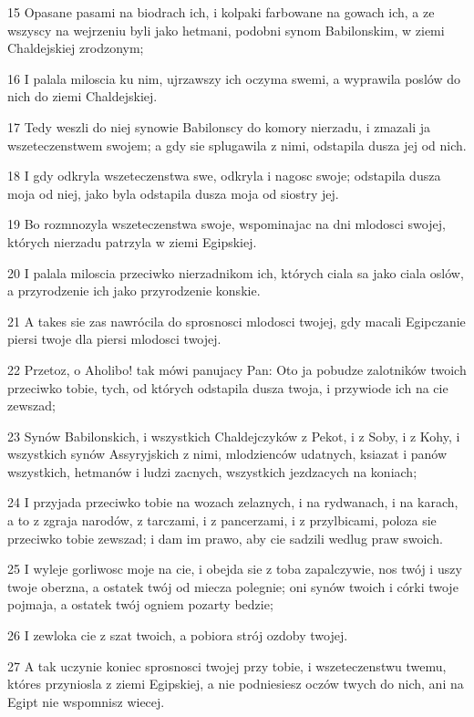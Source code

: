 \par 15 Opasane pasami na biodrach ich, i kolpaki farbowane na gowach ich, a ze wszyscy na wejrzeniu byli jako hetmani, podobni synom Babilonskim, w ziemi Chaldejskiej zrodzonym;
\par 16 I palala miloscia ku nim, ujrzawszy ich oczyma swemi, a wyprawila poslów do nich do ziemi Chaldejskiej.
\par 17 Tedy weszli do niej synowie Babilonscy do komory nierzadu, i zmazali ja wszeteczenstwem swojem; a gdy sie splugawila z nimi, odstapila dusza jej od nich.
\par 18 I gdy odkryla wszeteczenstwa swe, odkryla i nagosc swoje; odstapila dusza moja od niej, jako byla odstapila dusza moja od siostry jej.
\par 19 Bo rozmnozyla wszeteczenstwa swoje, wspominajac na dni mlodosci swojej, których nierzadu patrzyla w ziemi Egipskiej.
\par 20 I palala miloscia przeciwko nierzadnikom ich, których ciala sa jako ciala oslów, a przyrodzenie ich jako przyrodzenie konskie.
\par 21 A takes sie zas nawrócila do sprosnosci mlodosci twojej, gdy macali Egipczanie piersi twoje dla piersi mlodosci twojej.
\par 22 Przetoz, o Aholibo! tak mówi panujacy Pan: Oto ja pobudze zalotników twoich przeciwko tobie, tych, od których odstapila dusza twoja, i przywiode ich na cie zewszad;
\par 23 Synów Babilonskich, i wszystkich Chaldejczyków z Pekot, i z Soby, i z Kohy, i wszystkich synów Assyryjskich z nimi, mlodzienców udatnych, ksiazat i panów wszystkich, hetmanów i ludzi zacnych, wszystkich jezdzacych na koniach;
\par 24 I przyjada przeciwko tobie na wozach zelaznych, i na rydwanach, i na karach, a to z zgraja narodów, z tarczami, i z pancerzami, i z przylbicami, poloza  sie przeciwko tobie zewszad; i dam im prawo, aby cie sadzili wedlug praw swoich.
\par 25 I wyleje gorliwosc moje na cie, i obejda sie z toba zapalczywie, nos twój i uszy twoje oberzna, a ostatek twój od miecza polegnie; oni synów twoich i córki twoje pojmaja, a ostatek twój ogniem pozarty bedzie;
\par 26 I zewloka cie z szat twoich, a pobiora strój ozdoby twojej.
\par 27 A tak uczynie koniec sprosnosci twojej przy tobie, i wszeteczenstwu twemu, któres przyniosla z ziemi Egipskiej, a nie podniesiesz oczów twych do nich, ani na Egipt nie wspomnisz wiecej.
